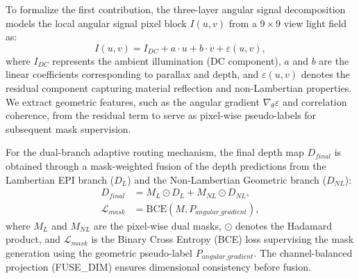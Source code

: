To formalize the first contribution, the three-layer angular signal decomposition models the local angular signal pixel block $I(u,v)$ from a $9 \times 9$ view light field as:
\begin{equation}
I(u,v) = I_{DC} + a \cdot u + b \cdot v + \varepsilon(u,v),
\label{eq:ch1_2}
\end{equation}
where $I_{DC}$ represents the ambient illumination (DC component), $a$ and $b$ are the linear coefficients corresponding to parallax and depth, and $\varepsilon(u,v)$ denotes the residual component capturing material reflection and non-Lambertian properties. We extract geometric features, such as the angular gradient $\nabla_{\theta} \varepsilon$ and correlation coherence, from the residual term to serve as pixel-wise pseudo-labels for subsequent mask supervision.

For the dual-branch adaptive routing mechanism, the final depth map $D_{final}$ is obtained through a mask-weighted fusion of the depth predictions from the Lambertian EPI branch ($D_L$) and the Non-Lambertian Geometric branch ($D_{NL}$):
\begin{align}
D_{final} &= M_L \odot D_L + M_{NL} \odot D_{NL}, \label{eq:ch1_3} \\
\mathcal{L}_{mask} &= \text{BCE}(M, P_{angular\_gradient}), \label{eq:ch1_4}
\end{align}
where $M_L$ and $M_{NL}$ are the pixel-wise dual masks, $\odot$ denotes the Hadamard product, and $\mathcal{L}_{mask}$ is the Binary Cross Entropy (BCE) loss supervising the mask generation using the geometric pseudo-label $P_{angular\_gradient}$. The channel-balanced projection (FUSE\_DIM) ensures dimensional consistency before fusion.

\begin{table}[!t]
\centering
\caption{Summary of Core Contributions and Corresponding Architectural Modules}
\label{tab:contributions_summary}
\end{table}


